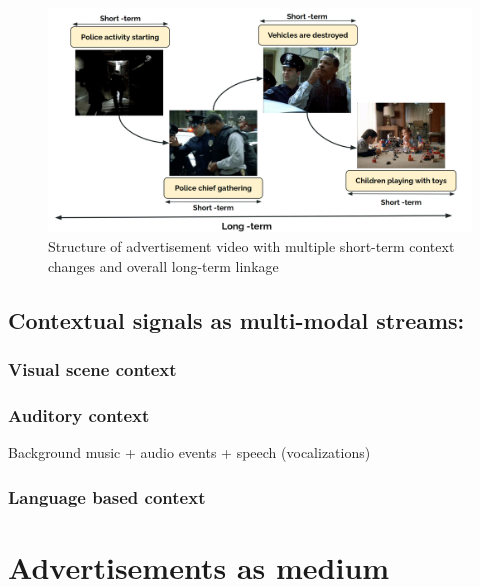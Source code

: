 \begin{figure}[h!]
\centering
\includegraphics[width=\textwidth]{figures/ads_structure_figure.png}
\caption{Structure of advertisement video with multiple short-term context changes and overall long-term linkage}
\label{ads_structure_set}
\end{figure}



\subsection{Contextual signals as multi-modal streams:}
    \subsubsection{Visual scene context}
    \subsubsection{Auditory context}
    Background music + audio events + speech (vocalizations)
    \subsubsection{Language based context}
\section{Advertisements as medium}
